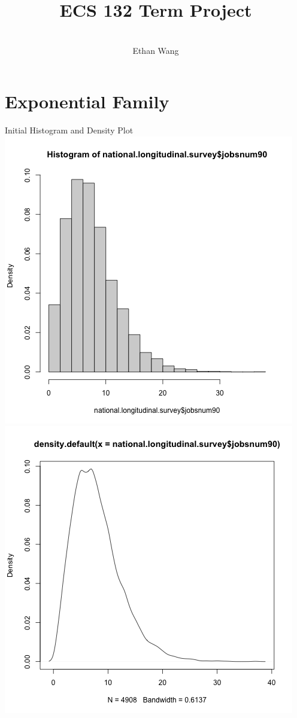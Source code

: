 \documentclass[12pt, letterpaper]{article}
\title{ECS 132 Term Project}
\author{\\ Ethan Wang}
\date{}
\begin{document}
\maketitle


\newpage
\noindent
\section*{Exponential Family}
\normalsize
Initial Histogram and Density Plot
\\
\includegraphics[scale=0.6]{jobsnum90_hist}
\\
\includegraphics[scale=0.6]{jobsnum90_densityplot}
\end{document}
